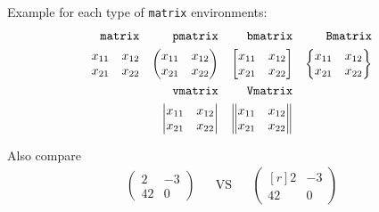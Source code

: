 \documentclass[11pt, a4paper]{report}
\begin{document}
		Example for each type of \texttt{matrix} environments:
		\begin{align*}
			\text{\texttt{matrix}} && \text{\texttt{pmatrix}} && \text{\texttt{bmatrix}} && \text{\texttt{Bmatrix}} \\
			\begin{matrix}
				x_{11} & x_{12} \\
				x_{21} & x_{22} \\
			\end{matrix} 
			&&
			\begin{pmatrix}
				x_{11} & x_{12} \\
				x_{21} & x_{22} \\
			\end{pmatrix}
			&&
			\begin{bmatrix}
				x_{11} & x_{12} \\
				x_{21} & x_{22} \\
			\end{bmatrix}
			&&
			\begin{Bmatrix}
				x_{11} & x_{12} \\
				x_{21} & x_{22} \\
			\end{Bmatrix} \\
			&& \text{\texttt{vmatrix}} && \text{\texttt{Vmatrix}} && \\
			&&
			\begin{vmatrix}
				x_{11} & x_{12} \\
				x_{21} & x_{22} \\
			\end{vmatrix}
			&&
			\begin{Vmatrix}
				x_{11} & x_{12} \\
				x_{21} & x_{22} \\
			\end{Vmatrix}
			&& 
		\end{align*}
		
		Also compare
		\begin{align*}
			\begin{pmatrix}
				2  & -3 \\
				42 & 0
			\end{pmatrix}
			&&
			\text{VS}
			&&
			\begin{pmatrix*}[r]
				2  & -3 \\
				42 & 0
			\end{pmatrix*}
		\end{align*}
%
\end{document}
